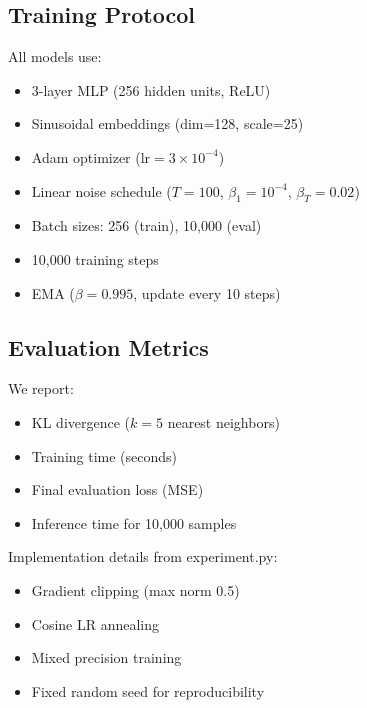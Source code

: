 \documentclass[final]{iclr2024_conference}
\begin{document}
\subsection{Training Protocol}
All models use:
\begin{itemize}
    \item 3-layer MLP (256 hidden units, ReLU)
    \item Sinusoidal embeddings (dim=128, scale=25)
    \item Adam optimizer ($\text{lr}=3\times10^{-4}$)
    \item Linear noise schedule ($T=100$, $\beta_1=10^{-4}$, $\beta_T=0.02$)
    \item Batch sizes: 256 (train), 10,000 (eval)
    \item 10,000 training steps
    \item EMA ($\beta=0.995$, update every 10 steps)
\end{itemize}

\subsection{Evaluation Metrics}
We report:
\begin{itemize}
    \item KL divergence ($k=5$ nearest neighbors)
    \item Training time (seconds)
    \item Final evaluation loss (MSE)
    \item Inference time for 10,000 samples
\end{itemize}

Implementation details from experiment.py:
\begin{itemize}
    \item Gradient clipping (max norm 0.5)
    \item Cosine LR annealing
    \item Mixed precision training
    \item Fixed random seed for reproducibility
\end{itemize}
\end{document}
